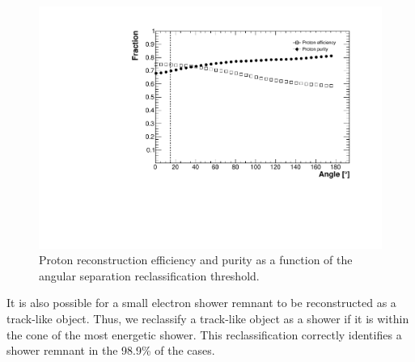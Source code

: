 \begin{figure}[htbp]
\centering
  \includegraphics[width=0.65\linewidth]{figures/proton_angle.pdf}
  \caption{Proton reconstruction efficiency and purity as a function of the angular separation reclassification threshold.}
  \label{fig:showerangle}
\end{figure}

It is also possible for a small electron shower remnant to be reconstructed as a track-like object. Thus, we reclassify a track-like object as a shower if it is within the cone of the most energetic shower. This reclassification correctly identifies a shower remnant in the 98.9\% of the cases.

